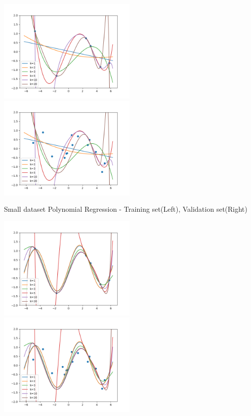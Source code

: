 \begin{answer}

\includegraphics[width=0.5\textwidth]{featuremaps/plot_small_train_poly.png}
\includegraphics[width=0.5\textwidth]{featuremaps/plot_small_valid_poly.png}

Small dataset Polynomial Regression - Training set(Left), Validation set(Right)

\includegraphics[width=0.5\textwidth]{featuremaps/plot_small_train_sine.png}
\includegraphics[width=0.5\textwidth]{featuremaps/plot_small_valid_sine.png}


\end{answer}
